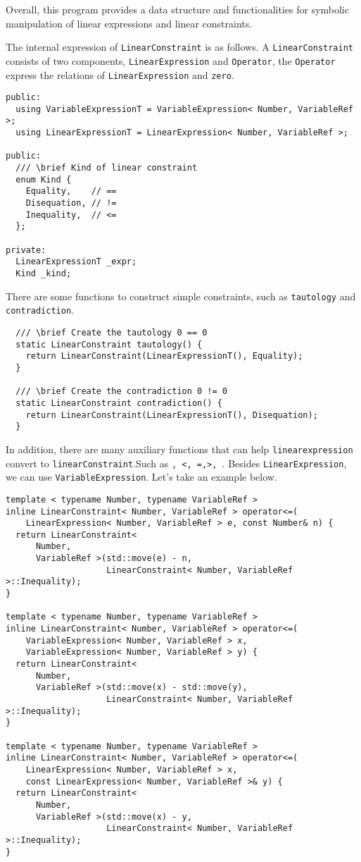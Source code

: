 \documentclass[12pt]{article}
\begin{document}
Overall, this program provides a data structure and functionalities for symbolic manipulation of linear expressions and linear constraints.

The internal expression of \texttt{LinearConstraint} is as follows. A \texttt{LinearConstraint} consists of two components, \texttt{LinearExpression} and \texttt{Operator}, the \texttt{Operator} express the relations of \texttt{LinearExpression} and \texttt{zero}. 
\begin{lstlisting}
public:
  using VariableExpressionT = VariableExpression< Number, VariableRef >;
  using LinearExpressionT = LinearExpression< Number, VariableRef >;

public:
  /// \brief Kind of linear constraint
  enum Kind {
    Equality,    // ==
    Disequation, // !=
    Inequality,  // <=
  };

private:
  LinearExpressionT _expr;
  Kind _kind;
\end{lstlisting}

There are some functions to construct simple constraints, such as \texttt{tautology} and \texttt{contradiction}.
\begin{lstlisting}
  /// \brief Create the tautology 0 == 0
  static LinearConstraint tautology() {
    return LinearConstraint(LinearExpressionT(), Equality);
  }

  /// \brief Create the contradiction 0 != 0
  static LinearConstraint contradiction() {
    return LinearConstraint(LinearExpressionT(), Disequation);
  }
\end{lstlisting}

In addition, there are many auxiliary functions that can help \texttt {linearexpression} convert to \texttt {linearConstraint}.Such as \texttt {\leq, <, =,>, \geq}. Besides \texttt{LinearExpression}, we can use \texttt{VariableExpression}. Let's take an example below.

\begin{lstlisting}
template < typename Number, typename VariableRef >
inline LinearConstraint< Number, VariableRef > operator<=(
    LinearExpression< Number, VariableRef > e, const Number& n) {
  return LinearConstraint<
      Number,
      VariableRef >(std::move(e) - n,
                    LinearConstraint< Number, VariableRef >::Inequality);
}

template < typename Number, typename VariableRef >
inline LinearConstraint< Number, VariableRef > operator<=(
    VariableExpression< Number, VariableRef > x,
    VariableExpression< Number, VariableRef > y) {
  return LinearConstraint<
      Number,
      VariableRef >(std::move(x) - std::move(y),
                    LinearConstraint< Number, VariableRef >::Inequality);
}

template < typename Number, typename VariableRef >
inline LinearConstraint< Number, VariableRef > operator<=(
    LinearExpression< Number, VariableRef > x,
    const LinearExpression< Number, VariableRef >& y) {
  return LinearConstraint<
      Number,
      VariableRef >(std::move(x) - y,
                    LinearConstraint< Number, VariableRef >::Inequality);
}
\end{lstlisting}
\end{document}
